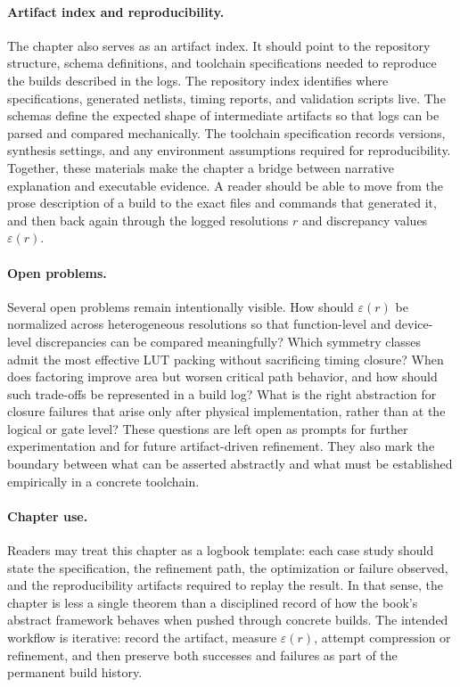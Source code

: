 \documentclass[11pt]{article}
\begin{document}
\paragraph{Artifact index and reproducibility.}
The chapter also serves as an artifact index. It should point to the repository structure, schema definitions, and toolchain specifications needed to reproduce the builds described in the logs. The repository index identifies where specifications, generated netlists, timing reports, and validation scripts live. The schemas define the expected shape of intermediate artifacts so that logs can be parsed and compared mechanically. The toolchain specification records versions, synthesis settings, and any environment assumptions required for reproducibility. Together, these materials make the chapter a bridge between narrative explanation and executable evidence. A reader should be able to move from the prose description of a build to the exact files and commands that generated it, and then back again through the logged resolutions \(r\) and discrepancy values \(\varepsilon(r)\).

\paragraph{Open problems.}
Several open problems remain intentionally visible. How should \(\varepsilon(r)\) be normalized across heterogeneous resolutions so that function-level and device-level discrepancies can be compared meaningfully? Which symmetry classes admit the most effective LUT packing without sacrificing timing closure? When does factoring improve area but worsen critical path behavior, and how should such trade-offs be represented in a build log? What is the right abstraction for closure failures that arise only after physical implementation, rather than at the logical or gate level? These questions are left open as prompts for further experimentation and for future artifact-driven refinement. They also mark the boundary between what can be asserted abstractly and what must be established empirically in a concrete toolchain.

\paragraph{Chapter use.}
Readers may treat this chapter as a logbook template: each case study should state the specification, the refinement path, the optimization or failure observed, and the reproducibility artifacts required to replay the result. In that sense, the chapter is less a single theorem than a disciplined record of how the book's abstract framework behaves when pushed through concrete builds. The intended workflow is iterative: record the artifact, measure \(\varepsilon(r)\), attempt compression or refinement, and then preserve both successes and failures as part of the permanent build history.
\end{document}
